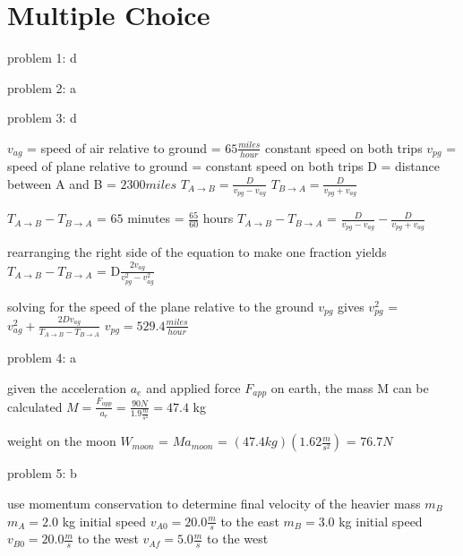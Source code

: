 \chapter{Multiple Choice}
\label{Multiple Choice}
problem 1: d

problem 2: a

problem 3: d

$v_{ag}$ = speed of air relative to ground = $65 \frac{miles}{hour}$ constant speed on both trips
$v_{pg}$ = speed of plane relative to ground = constant speed on both trips
D = distance between A and B = $2300 miles$
$T_{A \rightarrow B} = \frac{D}{v_{pg} - v_{ag}}$
$T_{B \rightarrow A} = \frac{D}{v_{pg} + v_{ag}}$
                                                                 
$T_{A \rightarrow B} - T_{B \rightarrow A}$ = $65$ minutes = $\frac{65}{60}$ hours
$T_{A \rightarrow B} - T_{B \rightarrow A}$ = $\frac{D}{v_{pg} - v_{ag}} - \frac{D}{v_{pg} + v_{ag}}$
                                                                   
rearranging the right side of the equation to make one fraction yields
$T_{A \rightarrow B} - T_{B \rightarrow A}$ = D$\frac{2v_{ag}}{v_{pg}^{2} - v_{ag}^{2}}$

                                                                 
solving for the speed of the plane relative to the ground $v_{pg}$ gives
$v_{pg}^{2}$ = $v_{ag}^{2} + \frac{2Dv_{ag}}{T_{A \rightarrow B} - T_{B \rightarrow A}}$
$v_{pg} = 529.4 \frac{miles}{hour}$

problem 4: a
                                                     
given the acceleration $a_{e}$ and applied force $F_{app}$ on earth, the mass M can be calculated
$M = \frac{F_{app}}{a_{e}} = \frac{90 N}{1.9 \frac{m}{s^{2}}} = 47.4$ kg
                                              
weight on the moon $W_{moon}$ = $Ma_{moon}$ = $(47.4 kg)(1.62 \frac{m}{s^{2}} )$ = $76.7 N$

problem 5: b

use momentum conservation to determine final velocity of the heavier mass $m_{B}$
$m_{A} = 2.0$ kg  initial speed $v_{A0} = 20.0 \frac{m}{s}$ to the east
$m_{B} = 3.0$ kg  initial speed $v_{B0} = 20.0 \frac{m}{s}$ to the west
$v_{Af} = 5.0 \frac{m}{s}$ to the west

